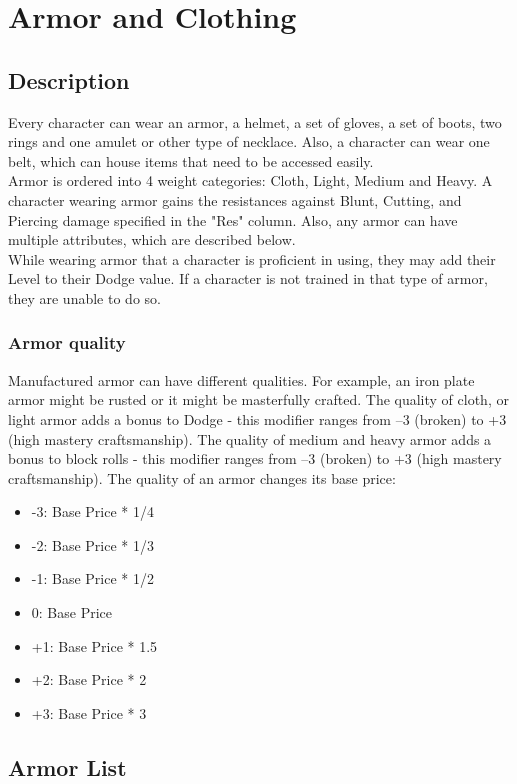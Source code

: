 \chapter{Armor and Clothing}\label{ch:armor}
\section{Description}\label{armorDescription}
Every character can wear an armor, a helmet, a set of gloves, a set of boots, two rings and one amulet or other type of necklace.
Also, a character can wear one belt, which can house items that need to be accessed easily.\\
Armor is ordered into 4 weight categories: Cloth, Light, Medium and Heavy.
A character wearing armor gains the resistances against Blunt, Cutting, and Piercing damage specified in the "Res" column.
Also, any armor can have multiple attributes, which are described below.\\
While wearing armor that a character is proficient in using, they may add their Level to their Dodge value.
If a character is not trained in that type of armor, they are unable to do so.
\subsection{Armor quality}\label{subsec:armorQuality}
Manufactured armor can have different qualities.
For example, an iron plate armor might be rusted or it might be masterfully crafted.
The quality of cloth, or light armor adds a bonus to Dodge - this modifier ranges from --3 (broken) to +3 (high mastery craftsmanship).
The quality of medium and heavy armor adds a bonus to block rolls - this modifier ranges from --3 (broken) to +3 (high mastery craftsmanship).
The quality of an armor changes its base price:\\

\begin{itemize}
    \item -3: Base Price * 1/4
    \item -2: Base Price * 1/3
    \item -1: Base Price * 1/2
    \item 0: Base Price
    \item +1: Base Price * 1.5
    \item +2: Base Price * 2
    \item +3: Base Price * 3
\end{itemize}

\section{Armor List}\label{armorList}


